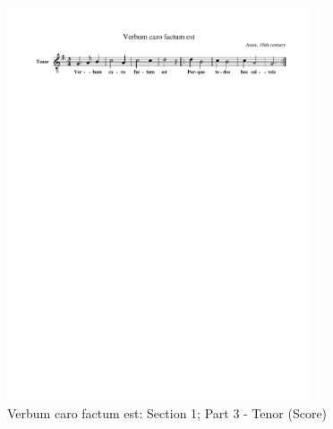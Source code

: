 

\vspace{-1.30cm}
\begin{figure}[h]
  \begin{center}
    \includegraphics[width=0.8\textwidth, clip=true, trim = 15mm 231mm 17mm 0mm]{img/103.pdf}
    \caption{Verbum caro factum est: Section 1; Part 3 - Tenor (Score)}
  \end{center}
\end{figure}



